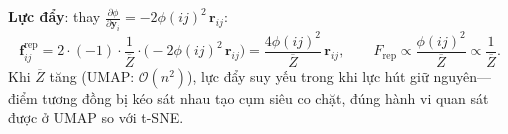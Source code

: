 \textbf{Lực đẩy}: thay $\frac{\partial\phi}{\partial\mathbf{y}_i} = -2\phi(ij)^2\,\mathbf{r}_{ij}$:
\[
  \mathbf{f}_{ij}^{\text{rep}}
  = 2\cdot(-1)\cdot\frac{1}{\overline{Z}}\cdot\bigl(-2\phi(ij)^2\,\mathbf{r}_{ij}\bigr)
  = \frac{4\phi(ij)^2}{\overline{Z}}\,\mathbf{r}_{ij}, \qquad
  F_{\text{rep}} \propto \frac{\phi(ij)^2}{\overline{Z}} \propto \frac{1}{\overline{Z}}.
\]
Khi $\overline{Z}$ tăng (UMAP: $\mathcal{O}(n^2)$), lực đẩy suy yếu trong khi lực hút giữ nguyên---điểm tương đồng bị kéo sát nhau tạo cụm siêu co chặt, đúng hành vi quan sát được ở UMAP so với t-SNE.

\FloatBarrier
